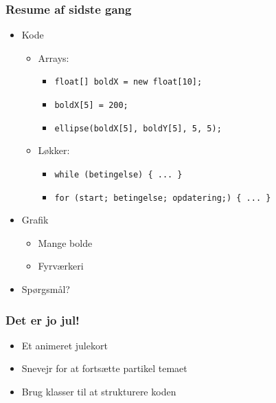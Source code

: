 \documentclass{beamer}
\begin{document}
\begin{frame}[fragile]
  \frametitle{Resume af sidste gang}
  
  \begin{itemize}
  \item Kode
    \begin{itemize}
    \item Arrays:
      \begin{itemize}
      \item \texttt{float[] boldX = new float[10];}\\
      \item \texttt{boldX[5] = 200;}\\
      \item \texttt{ellipse(boldX[5], boldY[5], 5, 5);}\\
      \end{itemize}
    \item Løkker:
      \begin{itemize}
      \item \texttt{while (betingelse) \{ ... \}}\\
      \item \texttt{for (start; betingelse; opdatering;) \{ ... \}}\\
      \end{itemize}
    \end{itemize}
  \item Grafik
    \begin{itemize}
    \item Mange bolde
    \item Fyrværkeri
    \end{itemize}  
  \item Spørgsmål?
  \end{itemize}  
\end{frame}


\begin{frame}[fragile]
  \frametitle{Det er jo jul!}
  
  \begin{itemize}
  \item Et animeret julekort
  \item Snevejr for at fortsætte partikel temaet
  \item Brug klasser til at strukturere koden
  \end{itemize}
  
\end{frame}
\end{document}
